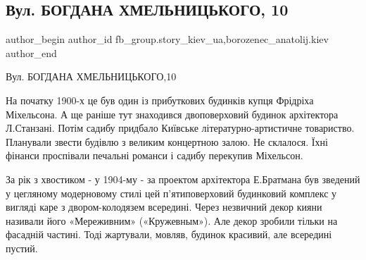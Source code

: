  
 
 
 
 
 
\subsection{Вул. БОГДАНА ХМЕЛЬНИЦЬКОГО, 10}
\label{sec:30_01_2022.fb.fb_group.story_kiev_ua.1.ulica_bogdana_hmelnickogo_10}
 
\ifcmt
 author_begin
   author_id fb_group.story_kiev_ua,borozenec_anatolij.kiev
 author_end
\fi

Вул. БОГДАНА ХМЕЛЬНИЦЬКОГО,10

На початку 1900-х це був один із прибуткових будинків купця Фрідріха
Міхельсона. А ще раніше тут знаходився двоповерховий будинок архітектора
Л.Станзані. Потім садибу придбало Київське літературно-артистичне товариство.
Планували звести будівлю з великим концертною залою. Не склалося. Їхні фінанси
проспівали печальні романси і садибу перекупив Міхельсон.

\raggedcolumns
\begin{multicols}{3} %
\setlength{\parindent}{0pt}



\end{multicols} %

За рік з хвостиком - у 1904-му - за проектом архітектора Е.Братмана був
зведений у цегляному модерновому стилі цей п’ятиповерховий будинковий комплекс
у вигляді каре з двором-колодязем всередині. Через незвичний декор кияни
називали його «Мереживним» («Кружевным»). Але декор зробили тільки на фасадній
частині. Тоді жартували, мовляв, будинок красивий, але всередині пустий.

